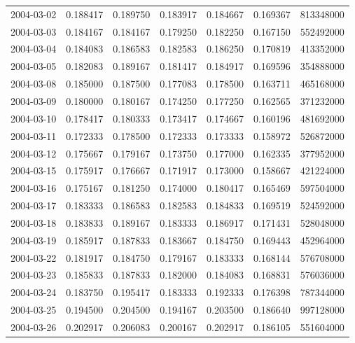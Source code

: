 \begin{tabular}{lrrrrrr}
2004-03-02 &    0.188417 &    0.189750 &    0.183917 &    0.184667 &    0.169367 &   813348000 \\
2004-03-03 &    0.184167 &    0.184167 &    0.179250 &    0.182250 &    0.167150 &   552492000 \\
2004-03-04 &    0.184083 &    0.186583 &    0.182583 &    0.186250 &    0.170819 &   413352000 \\
2004-03-05 &    0.182083 &    0.189167 &    0.181417 &    0.184917 &    0.169596 &   354888000 \\
2004-03-08 &    0.185000 &    0.187500 &    0.177083 &    0.178500 &    0.163711 &   465168000 \\
2004-03-09 &    0.180000 &    0.180167 &    0.174250 &    0.177250 &    0.162565 &   371232000 \\
2004-03-10 &    0.178417 &    0.180333 &    0.173417 &    0.174667 &    0.160196 &   481692000 \\
2004-03-11 &    0.172333 &    0.178500 &    0.172333 &    0.173333 &    0.158972 &   526872000 \\
2004-03-12 &    0.175667 &    0.179167 &    0.173750 &    0.177000 &    0.162335 &   377952000 \\
2004-03-15 &    0.175917 &    0.176667 &    0.171917 &    0.173000 &    0.158667 &   421224000 \\
2004-03-16 &    0.175167 &    0.181250 &    0.174000 &    0.180417 &    0.165469 &   597504000 \\
2004-03-17 &    0.183333 &    0.186583 &    0.182583 &    0.184833 &    0.169519 &   524592000 \\
2004-03-18 &    0.183833 &    0.189167 &    0.183333 &    0.186917 &    0.171431 &   528048000 \\
2004-03-19 &    0.185917 &    0.187833 &    0.183667 &    0.184750 &    0.169443 &   452964000 \\
2004-03-22 &    0.181917 &    0.184750 &    0.179167 &    0.183333 &    0.168144 &   576708000 \\
2004-03-23 &    0.185833 &    0.187833 &    0.182000 &    0.184083 &    0.168831 &   576036000 \\
2004-03-24 &    0.183750 &    0.195417 &    0.183333 &    0.192333 &    0.176398 &   787344000 \\
2004-03-25 &    0.194500 &    0.204500 &    0.194167 &    0.203500 &    0.186640 &   997128000 \\
2004-03-26 &    0.202917 &    0.206083 &    0.200167 &    0.202917 &    0.186105 &   551604000 \\

\end{tabular}
